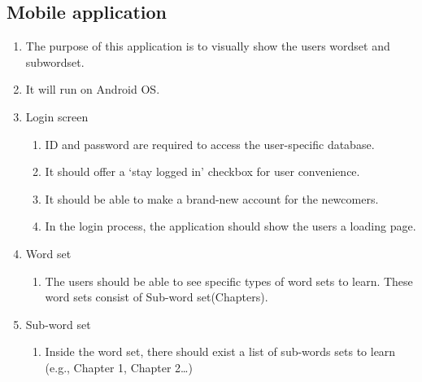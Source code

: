 \documentclass[conference]{IEEEtran}
\begin{document}
\subsection{Mobile application}

\begin{enumerate}
\item The purpose of this application is to visually show the users wordset and subwordset. 

\item It will run on Android OS.
\item Login screen
    \begin{enumerate}
    \item ID and password are required to access the user-specific database.
    \item It should offer a ‘stay logged in’ checkbox for user convenience.
    \item It should be able to make a brand-new account for the newcomers.
    \item In the login process, the application should show the users a loading page.
    \end{enumerate}
\item Word set
    \begin{enumerate}
    \item The users should be able to see specific types of word sets to learn. These word sets consist of Sub-word set(Chapters).
    \end{enumerate}
\item Sub-word set
    \begin{enumerate}
    \item Inside the word set, there should exist a list of sub-words sets to learn (e.g., Chapter 1, Chapter 2…)

\end{enumerate}
\end{enumerate}
\end{document}
